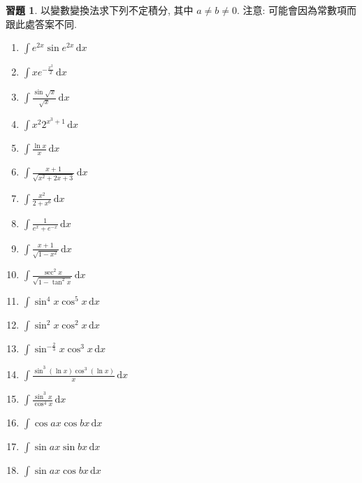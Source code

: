 \documentclass[12pt]{extarticle}
\newcommand{\ds}{\displaystyle}
\theoremstyle{definition}
\newtheorem*{exe}{習題}
\newcommand{\myline}{\noindent\makebox[\linewidth]{\rule{\paperwidth}{0.4pt}}}
\begin{document}
\myline

\begin{exe} 以變數變換法求下列不定積分, 其中 $a\ne b\ne 0$. 注意: 可能會因為常數項而跟此處答案不同. 
  \begin{multicols}{3}
    \begin{enumerate}\setlength{\itemsep}{0pt}
      \item $\ds\int\!e^{2x}\sin{e^{2x}}\,\text{d}x $%
      \item $\ds\int\!x e^{-\frac{x^2}{2}}\,\text{d}x $%
      \item $\ds\int\!\frac{\sin{\sqrt{x}}}{\sqrt{x}}\,\text{d}x $%
      \item $\ds\int\!x^2 2^{x^3 + 1}\,\text{d}x $%
      \item $\ds\int\!\frac{\ln x}{x}\,\text{d}x $%
      \item $\ds\int\!\frac{x + 1}{\sqrt{x^2 + 2x + 3}}\,\text{d}x $%
      \item $\ds\int\!\frac{x^2}{2 + x^6}\,\text{d}x $%
      \item $\ds\int\!\frac{1}{e^x + e^{-x}}\,\text{d}x $%
      \item $\ds\int\!\frac{x + 1}{\sqrt{1 - x^2}}\,\text{d}x $%
      \item $\ds\int\!\frac{\sec^2 x}{\sqrt{1 - \tan^2 x}}\,\text{d}x $%
      \item $\ds\int\!\sin^4 x\cos^5 x\,\text{d}x $%
      \item $\ds\int\!\sin^2 x\cos^2 x\,\text{d}x $%
      \item $\ds\int\!\sin^{-\frac{2}{3}} x\cos^3 x\,\text{d}x $%
      \item $\ds\int\!\frac{\sin^3(\ln x)\cos^3(\ln x)}{x}\,\text{d}x $%
      \item $\ds\int\!\frac{\sin^3 x}{\cos^4 x}\,\text{d}x $%
      \item $\ds\int\!\cos ax\cos bx\,\text{d}x $%
      \item $\ds\int\!\sin ax\sin bx\,\text{d}x $%
      \item $\ds\int\!\sin ax\cos bx\,\text{d}x $%
    \end{enumerate} 
  \end{multicols}
\end{exe}
\end{document}
